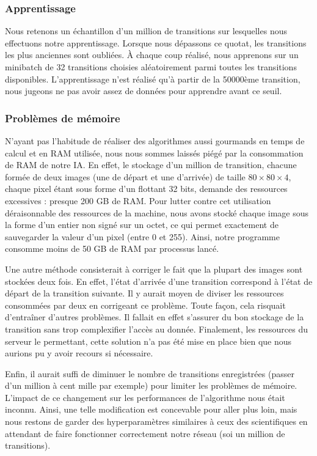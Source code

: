 \subsubsection{Apprentissage}

Nous retenons un échantillon d'un million de transitions sur lesquelles nous effectuons notre apprentissage. Lorsque nous dépassons ce quotat, les transitions les 
plus anciennes sont oubliées. À chaque coup réalisé, nous apprenons sur un minibatch de 32 transitions choisies aléatoirement parmi toutes les transitions disponibles.
L'apprentissage n'est réalisé qu'à partir de la 50000ème transition, nous jugeons ne pas avoir assez de données pour apprendre avant ce seuil.


\subsubsection{Problèmes de mémoire}

N'ayant pas l'habitude de réaliser des algorithmes aussi gourmands en temps de calcul et en RAM utilisée, nous nous sommes laissés piégé par la consommation de RAM de 
notre IA. En effet, le stockage d'un million de transition, chacune formée de deux images (une de départ et une d'arrivée) de taille $80\times80\times4$, chaque pixel
étant sous forme d'un flottant 32 bits, demande des ressources excessives : presque 200 GB de RAM. Pour lutter contre cet utilisation déraisonnable des ressources de
la machine, nous avons stocké chaque image sous la forme d'un entier non signé sur un octet, ce qui permet exactement de sauvegarder la valeur d'un pixel (entre 0 et 255).
Ainsi, notre programme consomme moins de 50 GB de RAM par processus lancé. 

Une autre méthode consisterait à corriger le fait que la plupart des images sont stockées deux fois. En effet, l'état d'arrivée d'une transition correspond à l'état
de départ de la transition suivante. Il y aurait moyen de diviser les ressources consommées par deux en corrigeant ce problème. Toute façon, cela risquait d'entraîner
d'autres problèmes. Il fallait en effet s'assurer du bon stockage de la transition sans trop complexifier l'accès au donnée. Finalement, les ressources du serveur le
permettant, cette solution n'a pas été mise en place bien que nous aurions pu y avoir recours si nécessaire.

Enfin, il aurait suffi de diminuer le nombre de transitions enregistrées (passer d'un million à cent mille par exemple) pour limiter les problèmes de mémoire. L'impact
de ce changement sur les performances de l'algorithme nous était inconnu. Ainsi, une telle modification est concevable pour aller plus loin, mais nous restons de garder
des hyperparamètres similaires à ceux des scientifiques en attendant de faire fonctionner correctement notre réseau (soi un million de transitions).


